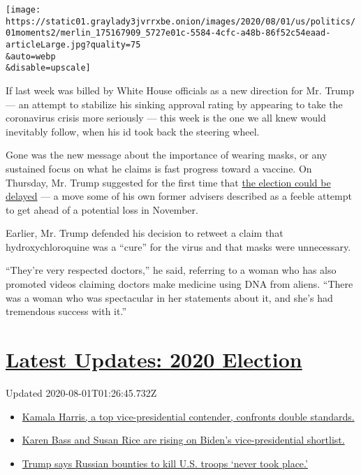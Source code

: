 \texttt{[image: https://static01.graylady3jvrrxbe.onion/images/2020/08/01/us/politics/01moments2/merlin\_175167909\_5727e01c-5584-4cfc-a48b-86f52c54eaad-articleLarge.jpg?quality=75\\\&auto=webp\\\&disable=upscale]}

If last week was billed by White House officials as a new direction for
Mr. Trump --- an attempt to stabilize his sinking approval rating by
appearing to take the coronavirus crisis more seriously --- this week is
the one we all knew would inevitably follow, when his id took back the
steering wheel.

Gone was the new message about the importance of wearing masks, or any
sustained focus on what he claims is fast progress toward a vaccine. On
Thursday, Mr. Trump suggested for the first time that
\href{https://www.nytimes3xbfgragh.onion/2020/07/30/us/politics/trump-delay-2020-election.html}{the
election could be delayed} --- a move some of his own former advisers
described as a feeble attempt to get ahead of a potential loss in
November.

Earlier, Mr. Trump defended his decision to retweet a claim that
hydroxychloroquine was a ``cure'' for the virus and that masks were
unnecessary.

``They're very respected doctors,'' he said, referring to a woman who
has also promoted videos claiming doctors make medicine using DNA from
aliens. ``There was a woman who was spectacular in her statements about
it, and she's had tremendous success with it.''

\hypertarget{latest-updates-2020-election}{%
\section{\texorpdfstring{\href{https://www.nytimes3xbfgragh.onion/2020/07/31/us/elections/biden-vs-trump.html?action=click\&pgtype=Article\&state=default\&region=MAIN_CONTENT_1\&context=storylines_live_updates}{Latest
Updates: 2020
Election}}{Latest Updates: 2020 Election}}\label{latest-updates-2020-election}}

Updated 2020-08-01T01:26:45.732Z

\begin{itemize}
\tightlist
\item
  \href{https://www.nytimes3xbfgragh.onion/2020/07/31/us/elections/biden-vs-trump.html?action=click\&pgtype=Article\&state=default\&region=MAIN_CONTENT_1\&context=storylines_live_updates\#link-29fdff45}{Kamala
  Harris, a top vice-presidential contender, confronts double
  standards.}
\item
  \href{https://www.nytimes3xbfgragh.onion/2020/07/31/us/elections/biden-vs-trump.html?action=click\&pgtype=Article\&state=default\&region=MAIN_CONTENT_1\&context=storylines_live_updates\#link-13ec3d9c}{Karen
  Bass and Susan Rice are rising on Biden's vice-presidential
  shortlist.}
\item
  \href{https://www.nytimes3xbfgragh.onion/2020/07/31/us/elections/biden-vs-trump.html?action=click\&pgtype=Article\&state=default\&region=MAIN_CONTENT_1\&context=storylines_live_updates\#link-49e9a016}{Trump
  says Russian bounties to kill U.S. troops `never took place.'}
\end{itemize}

